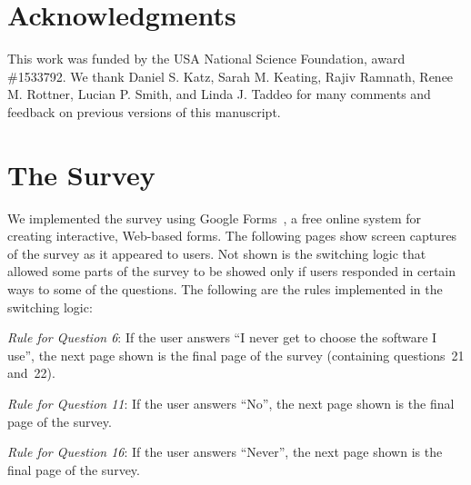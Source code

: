 \documentclass{casicswhitepaper}
\begin{document}



\section{Acknowledgments}

This work was funded by the USA National Science Foundation, award \#1533792.  We thank
Daniel S. Katz,
Sarah M. Keating,
Rajiv Ramnath,
Renee M. Rottner,
Lucian P. Smith, and
Linda J. Taddeo
for many comments and feedback on previous versions of this manuscript.


\clearpage
\appendix

\section{The Survey}
\label{apdx:survey}

We implemented the survey using Google Forms~\cite{googleforms}, a free online system for creating interactive, Web-based forms.  The following pages show screen captures of the survey as it appeared to users.  Not shown is the switching logic that allowed some parts of the survey to be showed only if users responded in certain ways to some of the questions.  The following are the rules implemented in the switching logic:
\begin{description}

\item \emph{Rule for Question 6}: If the user answers ``I never get to choose the software I use'', the next page shown is the final page of the survey (containing questions~21 and~22).

\item  \emph{Rule for Question 11}: If the user answers ``No'', the next page shown is the final page of the survey.

\item \emph{Rule for Question 16}:  If the user answers ``Never'', the next page shown is the final page of the survey.

\end{description}
\end{document}
